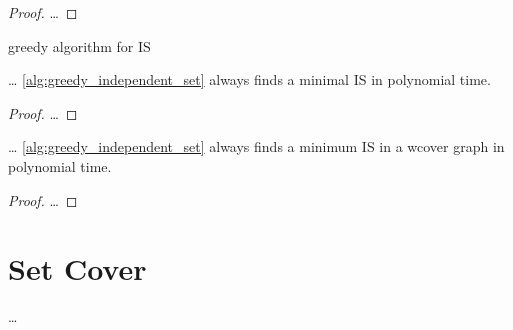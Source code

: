 \begin{proof}
  \ldots{}
\end{proof}



\begin{algorithm}
  \caption{\label{alg:greedy_independent_set}greedy algorithm for IS}
\end{algorithm}


\begin{theorem}
  \ldots{}
  \cref{alg:greedy_independent_set} always finds a minimal IS in polynomial time.
\end{theorem}

\begin{proof}
  \ldots{}
\end{proof}


\begin{theorem}
  \label{thm:well_covered_minimum_independent_set}
  \ldots{}
  \cref{alg:greedy_independent_set} always finds a minimum IS in a \gls{wcover} graph in polynomial time.
\end{theorem}

\begin{proof}
  \ldots{}
\end{proof}

\section{Set Cover}
\ldots{}


